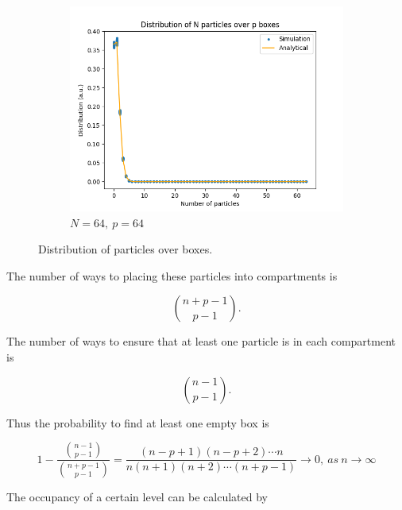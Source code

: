 \documentclass{assignmeownt}
\begin{document}
\begin{figure}
     \begin{subfigure}[b]{0.5\textwidth}
         \centering
         \includegraphics[width=\linewidth]{../block1/1-DistributionOfParticles/Results/64_64.png}
         \caption{$N=64,\ p=64$}
     \end{subfigure}
        \caption{Distribution of particles over boxes.}
        \label{fig:three graphs}
\end{figure}

The number of ways to placing these particles into compartments is

$${n+p-1\choose p-1}.$$

The number of ways to ensure that at least one particle is in each compartment is

$${n-1\choose p-1}.$$

Thus the probability to find at least one empty box is

$$1-\frac{{n-1\choose p-1}}{{n+p-1\choose p-1}}=\frac{(n-p+1)(n-p+2)\cdots n}{n(n+1)(n+2)\cdots (n+p-1)}\rightarrow 0,\ as\ n\rightarrow \infty$$

\bigskip


The occupancy of a certain level can be calculated by
\end{document}
